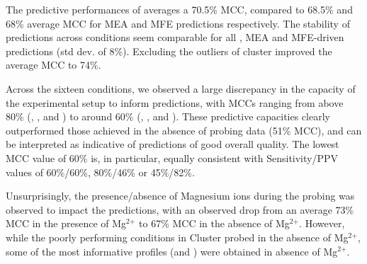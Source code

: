 \documentclass[a4,center,fleqn]{NAR}
\begin{document}
The predictive performances of \OurTool averages a 70.5\% MCC, compared to 68.5\% and 68\% average MCC for MEA and MFE predictions respectively.
The stability of predictions across conditions seem comparable for all \OurTool, MEA and MFE-driven predictions (std dev. of 8\%). Excluding the outliers of cluster  improved the average MCC to 74\%.

Across the sixteen conditions, we observed a large discrepancy in the capacity of the experimental setup to inform predictions, with MCCs ranging from above 80\% (\NMIA, \NMIAMg, \OneMSevILU and \OneMSevILUMg) to around 60\% (\NAICE, \BzCN, \OneMSevCE and \NMIACE). 
 These predictive capacities clearly outperformed those achieved in the absence of probing data (51\% MCC), and can be interpreted as indicative of predictions of good overall quality. The lowest MCC value of 60\% is, in particular, equally consistent with Sensitivity/PPV values of 60\%/60\%, 80\%/46\% or 45\%/82\%.

Unsurprisingly, the presence/absence of Magnesium ions during the probing was observed to impact the predictions, with an observed drop from an average 73\% MCC in the presence of Mg$^\text{2+}$ to 67\% MCC in the absence of Mg$^\text{2+}$. However, while the poorly performing conditions in Cluster   probed in the absence of Mg$^\text{2+}$, some of the most informative profiles (\OneMSevILU and \NMIA) were obtained in absence of Mg$^\text{2+}$.
\end{document}
